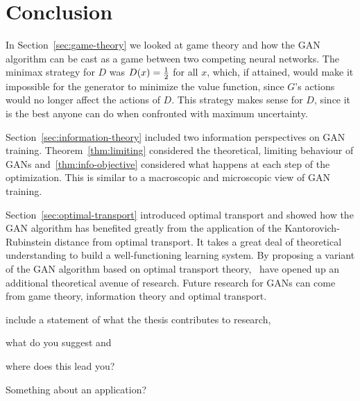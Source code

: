 \section{Conclusion}

In Section~\ref{sec:game-theory} we looked at game theory and how the GAN
algorithm can be cast as a game between two competing neural networks. The
minimax strategy for $D$ was $D(x) = {1 \over 2}$ for all $x$, which, if
attained, would make it impossible for the generator to minimize the value
function, since $G$'s actions would no longer affect the actions of $D$. This
strategy makes sense for $D$, since it is the best anyone can do when confronted
with maximum uncertainty.

Section~\ref{sec:information-theory} included two information perspectives on
GAN training. Theorem~\ref{thm:limiting} considered the theoretical, limiting
behaviour of GANs and~\ref{thm:info-objective} considered what happens at each
step of the optimization. This is similar to a macroscopic and microscopic view
of GAN training.

Section~\ref{sec:optimal-transport} introduced optimal transport and showed how
the GAN algorithm has benefited greatly from the application of the
Kantorovich-Rubinstein distance from optimal transport. It takes a great deal of
theoretical understanding to build a well-functioning learning system. By
proposing a variant of the GAN algorithm based on optimal transport
theory,~\cite{ref:arjovsky-2017} have opened up an additional theoretical avenue
of research. Future research for GANs can come from game theory, information
theory and optimal transport.

include a statement of what the thesis contributes to research,

what do you suggest and

where does this lead you?

Something about an application?

